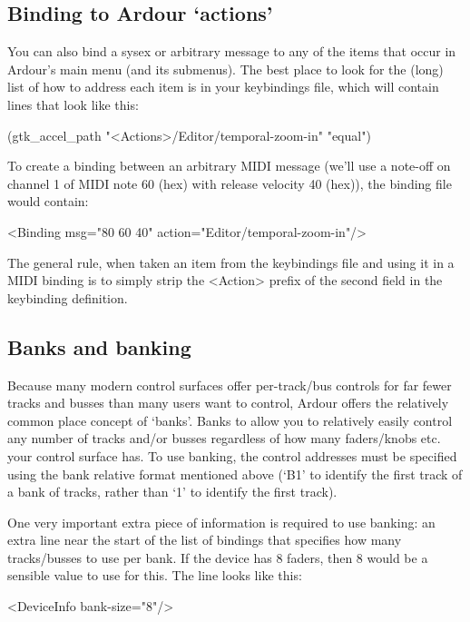 \documentclass[10pt,a4paper]{book}
\begin{document}
{\subsection{Binding to Ardour `actions'}

You can also bind a sysex or arbitrary message to any of the items
that occur in Ardour's main menu (and its submenus). The best place to
look for the (long) list of how to address each item is in your
keybindings file, which will contain lines that look like this:

\begin{listing}
(gtk\_accel\_path "<Actions>/Editor/temporal-zoom-in" "equal")
\end{listing}

To create a binding between an arbitrary MIDI message (we'll use a
note-off on channel 1 of MIDI note 60 (hex) with release velocity 40
(hex)), the binding file would contain:

\begin{listing}
<Binding msg="80 60 40" action="Editor/temporal-zoom-in"/>
\end{listing}

The general rule, when taken an item from the keybindings file and
using it in a MIDI binding is to simply strip the <Action> prefix of
the second field in the keybinding definition.

\subsection{Banks and banking}

Because many modern control surfaces offer per-track/bus controls for
far fewer tracks and busses than many users want to control, Ardour
offers the relatively common place concept of `banks'. Banks to allow
you to relatively easily control any number of tracks and/or busses
regardless of how many faders/knobs etc. your control surface has. To
use banking, the control addresses must be specified using the bank
relative format mentioned above (`B1' to identify the first track of a
bank of tracks, rather than `1' to identify the first track).

One very important extra piece of information is required to use
banking: an extra line near the start of the list of bindings that
specifies how many tracks/busses to use per bank. If the device has 8
faders, then 8 would be a sensible value to use for this. The line
looks like this:

\begin{listing}
<DeviceInfo bank-size="8"/>
\end{listing}

}
\end{document}
